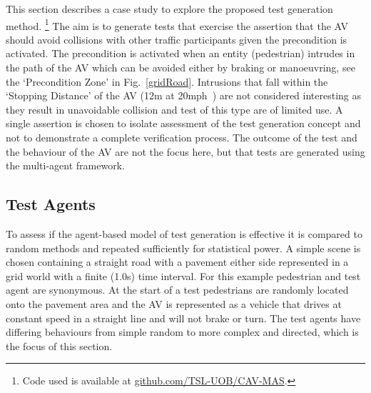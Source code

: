 \documentclass[letterpaper, 10 pt, journal, twoside]{IEEEtran}
\begin{document}
This section describes a case study to explore the proposed test generation method.%
\footnote{ Code used is available at \url{github.com/TSL-UOB/CAV-MAS}.} %
%
The aim is to generate tests that exercise the assertion that the AV should avoid collisions with other traffic participants given the precondition is activated. %
The precondition is activated when an entity (pedestrian) intrudes in the path of the AV which can be avoided either by braking or manoeuvring, see the `Precondition Zone' in Fig.~\ref{gridRoad}. Intrusions that fall within the `Stopping Distance' of the AV (12m at 20mph~\cite{codes2015highway}) are not considered interesting as they result in unavoidable collision and test of this type are of limited use. %
%
%
A single assertion is chosen to isolate assessment of the test generation concept and not to demonstrate a complete verification process. %
%
The outcome of the test and the behaviour of the AV are not the focus here, but that tests are generated using the multi-agent framework.  %



\subsection{Test Agents}
To assess if the agent-based model of test generation is effective it is compared to random methods and repeated sufficiently for statistical power. A simple scene is chosen containing a straight road with a pavement either side represented in a grid world with a finite (1.0s) time interval. For this example pedestrian and test agent are synonymous. At the start of a test pedestrians are randomly located onto the pavement area and the AV is represented as a vehicle that drives at constant speed in a straight line and will not brake or turn. The test agents have differing behaviours from simple random to more complex and directed, which is the focus of this section. 
\end{document}
